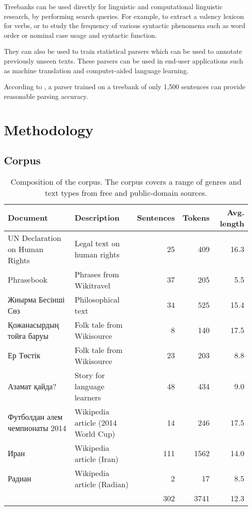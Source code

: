 \documentclass[a4paper,11pt, onecolumn,twoside]{article}
\begin{document}
Treebanks can be used directly for linguistic and computational linguistic research, by
performing search queries. For example, to extract a valency lexicon for verbs, or to
study the frequency of various syntactic phenomena such as word order or nominal case usage
and syntactic function.

They can also be used to train statistical parsers which can
be used to annotate previously unseen texts. These parsers can be used in end-user applications
such as machine translation and computer-aided language learning.

According to \textcite{nivre08}, a parser trained on a treebank of only 1,500 sentences 
can provide reasonable parsing accuracy.


\section{Methodology}\label{sec:method}

\subsection{Corpus}

\begin{table}[htbp]
  \centering
  \caption{Composition of the corpus. The corpus covers a range of genres and text types from free and public-domain sources.}
	\begin{small}
		\begin{tabular}{llrrr}
			\toprule
				\textbf{Document} & \textbf{Description} & \textbf{Sentences} & \textbf{Tokens} & \textbf{Avg. length}\\
			\midrule
				UN Declaration on Human Rights & Legal text on human rights & 25 & 409 & 16.3 \\
				Phrasebook                     & Phrases from Wikitravel   & 37 & 205 & 5.5 \\
				Жиырма Бесінші Сөз             & Philosophical text        & 34 & 525 & 15.4 \\ 
				Қожанасырдың тойға баруы       & Folk tale from Wikisource  & 8 & 140 & 17.5 \\
				Ер Төстік                      & Folk tale from Wikisource  & 23 & 203 & 8.8 \\
				Азамат қайда?                  & Story for language learners & 48 & 434 & 9.0 \\
				Футболдан әлем чемпионаты 2014 & Wikipedia article (2014 World Cup) & 14 & 246 & 17.5 \\
				Иран & Wikipedia article (Iran)                                & 111 & 1562 & 14.0 \\
				Радиан & Wikipedia article (Radian)                            & 2 & 17 & 8.5 \\
			\midrule
			\multicolumn{2}{c}{~} & 302 & 3741 & 12.3 \\\cmidrule[\heavyrulewidth]{3-5}
		\end{tabular}
	\end{small}
\end{table}
\end{document}
